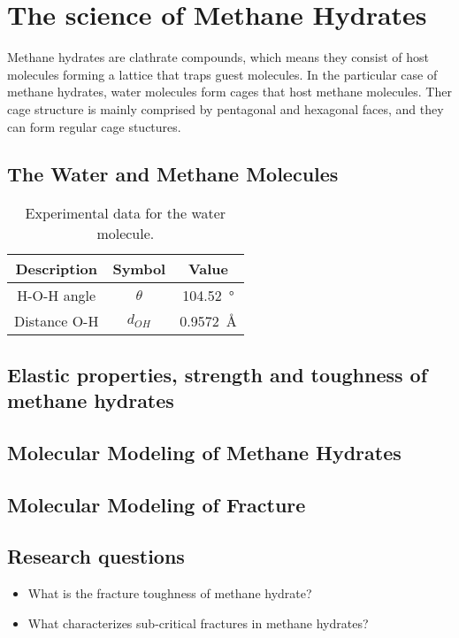 \chapter{The science of Methane Hydrates}
Methane hydrates are clathrate compounds, which means they consist of host molecules forming a lattice that traps guest molecules. In the particular case of methane hydrates, water molecules form cages that host methane molecules. Ther cage structure is mainly comprised by pentagonal and hexagonal faces, and they can form regular cage stuctures.



\section{The Water and Methane Molecules}
\begin{table}[h!tb]
\caption{Experimental data for the water molecule.}
\label{tb:intro:h2odata}
\begin{center}
\begin{tabular}{c|c|c}
Description & Symbol & Value \\
\hline
H-O-H angle & $\theta$ & \SI{104.52}{\degree} \\
Distance O-H & $d_{OH}$ & \SI{0.9572}{\angstrom} \\
\end{tabular}
\end{center}
\end{table}


\section{Elastic properties, strength and toughness of methane hydrates}

\section{Molecular Modeling of Methane Hydrates}

\section{Molecular Modeling of Fracture}

\section{Research questions}
\begin{itemize}
\item What is the fracture toughness of methane hydrate?
\item What characterizes sub-critical fractures in methane hydrates? 
\end{itemize}